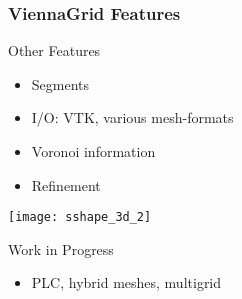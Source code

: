 


\begin{frame}[fragile]
\frametitle{ViennaGrid Features}
 \begin{block}{Other Features}
  \begin{itemize}
   \item Segments
   \item I/O: VTK, various mesh-formats
   \item Voronoi information
   \item Refinement
  \end{itemize}
  
  \vspace*{-3cm}
  \begin{flushright}
    \texttt{[image: sshape\_3d\_2]}
  \end{flushright}
 \end{block}

  \vspace*{-2cm}
 \begin{block}{Work in Progress}
  \begin{itemize}
   \item PLC, hybrid meshes, multigrid
  \end{itemize}
  
 \end{block}
\end{frame}





